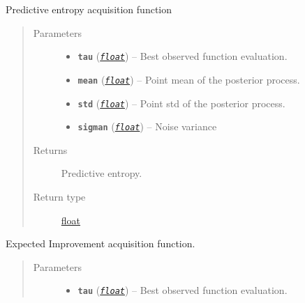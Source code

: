 \documentclass[letterpaper,10pt,english]{sphinxmanual}
\begin{document}
\begin{fulllineitems}
\begin{fulllineitems}
\label{pyGPGO.acquisition:pyGPGO.acquisition.Acquisition.Entropy}
Predictive entropy acquisition function
\begin{quote}\begin{description}
\item[{Parameters}] \leavevmode\begin{itemize}
\item {} 
\textbf{\texttt{tau}} (\href{https://docs.python.org/2/library/functions.html\#float}{\emph{\texttt{float}}}) -- Best observed function evaluation.

\item {} 
\textbf{\texttt{mean}} (\href{https://docs.python.org/2/library/functions.html\#float}{\emph{\texttt{float}}}) -- Point mean of the posterior process.

\item {} 
\textbf{\texttt{std}} (\href{https://docs.python.org/2/library/functions.html\#float}{\emph{\texttt{float}}}) -- Point std of the posterior process.

\item {} 
\textbf{\texttt{sigman}} (\href{https://docs.python.org/2/library/functions.html\#float}{\emph{\texttt{float}}}) -- Noise variance

\end{itemize}

\item[{Returns}] \leavevmode
Predictive entropy.

\item[{Return type}] \leavevmode
\href{https://docs.python.org/2/library/functions.html\#float}{float}

\end{description}\end{quote}

\end{fulllineitems}


\begin{fulllineitems}
\label{pyGPGO.acquisition:pyGPGO.acquisition.Acquisition.ExpectedImprovement}
Expected Improvement acquisition function.
\begin{quote}\begin{description}
\item[{Parameters}] \leavevmode\begin{itemize}
\item {} 
\textbf{\texttt{tau}} (\href{https://docs.python.org/2/library/functions.html\#float}{\emph{\texttt{float}}}) -- Best observed function evaluation.


\end{itemize}
\end{description}
\end{quote}
\end{fulllineitems}
\end{fulllineitems}
\end{document}
